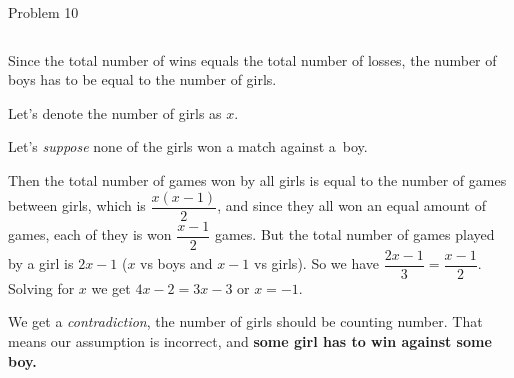 \documentclass[9pt,aspectratio=169]{beamer}
\begin{document}
\begin{frame}{Problem 10}
\begin{columns}[T]
\begin{column}{0.5\textwidth}
      Since the total number of wins equals the total number of losses, the number of boys has to be equal to the number of girls.

      Let's denote the number of girls as $x$.
      \medskip

      Let's \emph{suppose} none of the girls won a match against a~boy. 
      
      Then the total number of games won by all girls is equal to the number of games between girls, which is $\dfrac{x (x -1)}{2}$, and since they all won an equal amount of games, each of they is won $\dfrac{x-1}{2}$ games. But the total number of games played by a girl is $2x - 1$ ($x$ vs boys and $x-1$ vs girls). So we have $\dfrac{2x -1}{3} = \dfrac{x -1}{2}$. Solving for $x$ we get $4 x - 2 = 3x -3$ or $x = -1$. 
      
      We get a \emph{contradiction}, the number of girls should be counting number. That means our assumption is incorrect, and \textbf{some girl has to win against some boy.}
    \end{column}
  \end{columns}
\end{frame}


\end{document}
